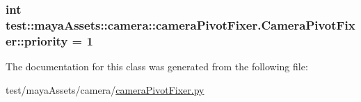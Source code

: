 \hypertarget{classtest_1_1mayaAssets_1_1camera_1_1cameraPivotFixer_1_1CameraPivotFixer_a86f4dde5e47b0fe9eb4bf1af1edbef77}{
\subsubsection[{priority}]{\setlength{\rightskip}{0pt plus 5cm}int {\bf test\-::maya\-Assets\-::camera\-::camera\-Pivot\-Fixer.\-Camera\-Pivot\-Fixer\-::priority} = 1}}\label{db/d17/classtest_1_1mayaAssets_1_1camera_1_1cameraPivotFixer_1_1CameraPivotFixer_a86f4dde5e47b0fe9eb4bf1af1edbef77}


\-The documentation for this class was generated from the following file\-:\begin{DoxyCompactItemize}
\item 
test/maya\-Assets/camera/\hyperlink{cameraPivotFixer_8py}{camera\-Pivot\-Fixer.\-py}\end{DoxyCompactItemize}
